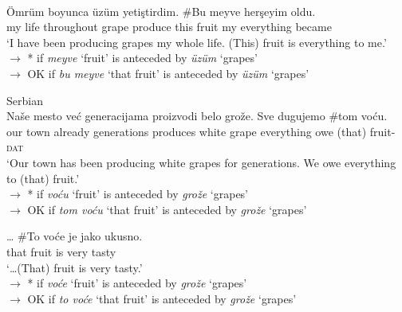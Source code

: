 \documentclass[output=paper,
modfonts
]{langscibook}
\begin{document}
	
	\ea \label{ex:despic:12}
	 \\
	\gll 
	{\"Omr\"um} {boyunca} {\"uz\"um} {yeti\c stirdim}. {\textnormal{\#}{\op}Bu{\cp}} {meyve} {her\c seyim} {oldu}. \\
	{my life} throughout grape produce \phantom{(\#}this fruit {my everything} became \\ 
	\glt `I have been producing grapes my whole life. (This) fruit is everything to me.' \\ 
	$\rightarrow$ * if \textit{meyve} `fruit' is anteceded by \textit{\"uz\"um} `grapes' \\
	$\rightarrow$ OK if \textit{bu meyve} `that fruit' is anteceded by \textit{\"uz\"um} `grapes'
	\z 
	
	
	\ea \label{ex:despic:13}
	Serbian \\
	\ea \label{ex:despic:13a}
	\gll
	{Na\v se} {mesto} {ve\'c} {generacijama} {proizvodi} {belo} {gro\v z\dj e}. {Sve} {dugujemo} {\textnormal{\#}{\op}tom{\cp}} {vo\'cu}. \\
	our town already generations produces white grape everything owe \phantom{\#}(that) fruit-\textsc{dat} \\ 
	\glt `Our town has been producing white grapes for generations. We owe everything to (that) fruit.' \\ 
	$\rightarrow$ * if \textit{vo\'cu} `fruit' is anteceded by \textit{gro\v z\dj e} `grapes' \\
	$\rightarrow$ OK if \textit{tom vo\'cu} `that fruit' is anteceded by \textit{gro\v z\dj e} `grapes'
	
	\ex \label{ex:despic:13b}
	\gll 
	{\ldots} {\textnormal{\#}{\op}To{\cp}} {vo\'ce} {je} {jako} {ukusno}.  \\
	{} \phantom{\#{\op}}that fruit is very tasty \\
	\glt `\ldots (That) fruit is very tasty.' \\
	$\rightarrow$ * if \textit{vo\'ce} `fruit' is anteceded by \textit{gro\v z\dj e} `grapes' \\
	$\rightarrow$ OK if \textit{to vo\'ce} `that fruit' is anteceded by \textit{gro\v z\dj e} `grapes' 
	\z
	\z 
	
\end{document}
